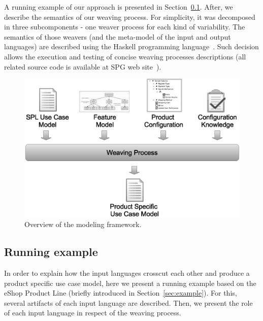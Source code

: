 \documentclass{llncs}
\begin{document}
A running example of our approach is presented in Section~\ref{sub:running}. After, we describe the semantics of our weaving process. For 
simplicity, it was decomposed in three subcomponents - one weaver process for each kind of variability.  The semantics of those 
weavers (and the meta-model of the input and output languages) are described using the Haskell programming language~\cite{haskell-report}. 
Such decision allows the execution and testing of concise weaving processes descriptions (all related source code is available at 
SPG web site~\cite{spg-url}).


\begin{figure}[h]
 \begin{center}
  \includegraphics[scale=0.30]{img/weave-process2.eps}
  \caption{Overview of the modeling framework.}
  \label{fig:weave-process}
  \end{center}
\end{figure}

\subsection{Running example}
\label{sub:running}

In order to explain how the input languages crosscut each other and produce a product specific use case model, here we present a 
running example based on the eShop Product Line (briefly introduced in Section~\ref{sec:example}). For this, several artifacts of each 
input language are described. Then, we present the role of each input language in respect of the weaving process.
\end{document}
